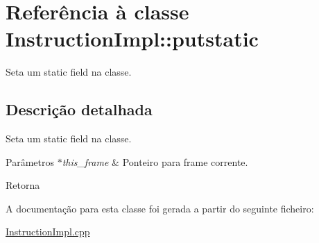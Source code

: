 \hypertarget{class_instruction_impl_1_1putstatic}{}\section{Referência à classe Instruction\+Impl\+:\+:putstatic}
\label{class_instruction_impl_1_1putstatic}


Seta um static field na classe.  




\subsection{Descrição detalhada}
Seta um static field na classe. 


\begin{DoxyParams}{Parâmetros}
{\em $\ast$this\+\_\+frame} & Ponteiro para frame corrente. \\
\hline
\end{DoxyParams}
\begin{DoxyReturn}{Retorna}

\end{DoxyReturn}


A documentação para esta classe foi gerada a partir do seguinte ficheiro\+:\begin{DoxyCompactItemize}
\item 
\hyperlink{_instruction_impl_8cpp}{Instruction\+Impl.\+cpp}\end{DoxyCompactItemize}
